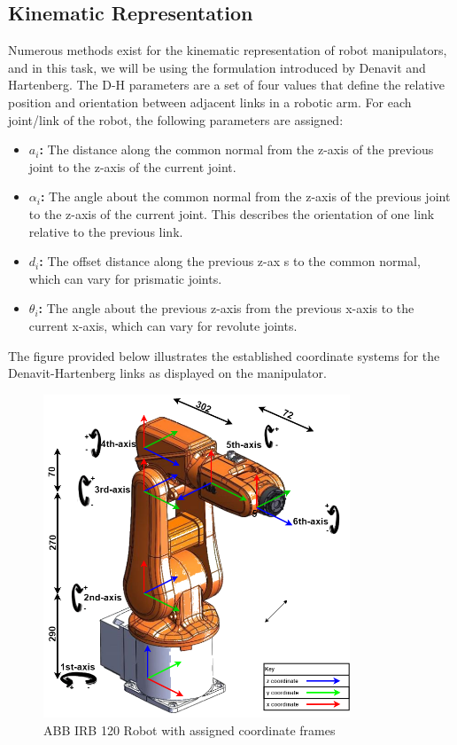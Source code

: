 \subsection{Kinematic Representation}

Numerous methods exist for the kinematic representation of robot manipulators, and in this task, we will be using the formulation introduced by Denavit and Hartenberg. The D-H parameters are a set of four values that define the relative position and orientation between adjacent links in a robotic arm. For each joint/link of the robot, the following parameters are assigned:


\begin{itemize}
  \item \textbf{$a_i$:} The distance along the common normal from the z-axis of the previous joint to the z-axis of the current joint.
  \item \textbf{$\alpha_i$:} The angle about the common normal from the z-axis of the previous joint to the z-axis of the current joint. This describes the orientation of one link relative to the previous link.
  \item \textbf{$d_i$:} The offset distance along the previous z-ax s to the common normal, which can vary for prismatic joints.
  \item \textbf{$\theta_i$:} The angle about the previous z-axis from the previous x-axis to the current x-axis, which can vary for revolute joints.
\end{itemize}

\noindent The figure provided below illustrates the established coordinate systems for the Denavit-Hartenberg links as displayed on the manipulator.

\begin{figure}[H]
  \centering
  \includegraphics[width=3.6in ]{pics/coordinate frames abb120.drawio.png}
  \caption{ABB IRB 120 Robot with assigned coordinate frames}\label{assigned_coordinates}
\end{figure}


